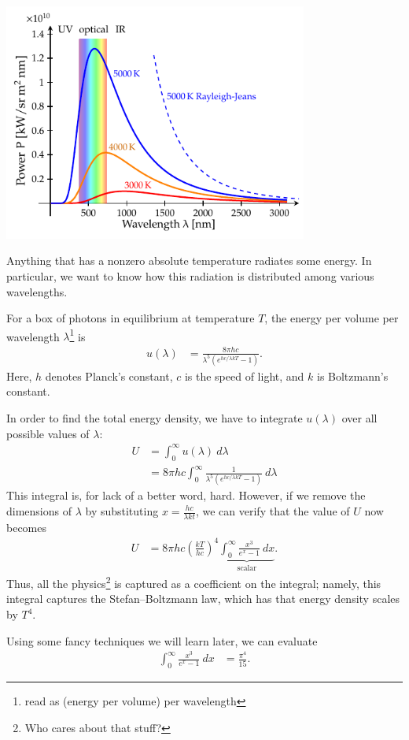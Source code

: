\documentclass[10pt]{mypackage}
\begin{document}
\begin{example}\hfill
  \begin{center}
    \includegraphics[width=10cm]{images/blackbody.pdf}
  \end{center}
  Anything that has a nonzero absolute temperature radiates some energy. In particular, we want to know how this radiation is distributed among various wavelengths.\newline

  For a box of photons in equilibrium at temperature $T$, the energy per volume per wavelength $\lambda$\footnote{read as (energy per volume) per wavelength} is
  \begin{align*}
    u\left(\lambda\right) &= \frac{8\pi h c}{\lambda^{5}\left(e^{h c/\lambda kT} - 1\right)}.
  \end{align*}
  Here, $h$ denotes Planck's constant, $c$ is the speed of light, and $k$ is Boltzmann's constant.\newline

  In order to find the total energy density, we have to integrate $u(\lambda)$ over all possible values of $\lambda$:
  \begin{align*}
    U &= \int_{0}^{\infty} u\left(\lambda\right)\:d\lambda\\
      &= 8\pi h c\int_{0}^{\infty}\frac{1}{\lambda^{5}\left(e^{hc/\lambda k T} - 1\right)} \:d\lambda
  \end{align*}
  This integral is, for lack of a better word, hard. However, if we remove the dimensions of $\lambda$ by substituting $x = \frac{hc}{\lambda k t}$, we can verify that the value of $U$ now becomes
  \begin{align*}
    U &= 8\pi h c \left(\frac{kT}{hc}\right)^{4}\underbrace{\int_{0}^{\infty} \frac{x^3}{e^x-1}\:dx}_{\text{scalar}}.
  \end{align*}
  Thus, all the physics\footnote{Who cares about that stuff?} is captured as a coefficient on the integral; namely, this integral captures the Stefan--Boltzmann law, which has that energy density scales by $T^{4}$.\newline

  Using some fancy techniques we will learn later, we can evaluate
  \begin{align*}
    \int_{0}^{\infty} \frac{x^3}{e^x-1}\:dx &= \frac{\pi^4}{15}.
  \end{align*}
\end{example}
\end{document}
